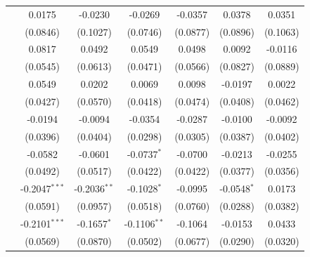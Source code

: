 \begin{tabular}{lcccccc}
   \qquad 2004                    & 0.0175                & -0.0230         & -0.0269               & -0.0357         & 0.0378         & 0.0351\\   
                                    & (0.0846)              & (0.1027)        & (0.0746)              & (0.0877)        & (0.0896)       & (0.1063)\\   
   \qquad 2005                    & 0.0817                & 0.0492          & 0.0549                & 0.0498          & 0.0092         & -0.0116\\   
                                    & (0.0545)              & (0.0613)        & (0.0471)              & (0.0566)        & (0.0827)       & (0.0889)\\   
   \qquad 2006                    & 0.0549                & 0.0202          & 0.0069                & 0.0098          & -0.0197        & 0.0022\\   
                                    & (0.0427)              & (0.0570)        & (0.0418)              & (0.0474)        & (0.0408)       & (0.0462)\\   
   \qquad 2007                    & -0.0194               & -0.0094         & -0.0354               & -0.0287         & -0.0100        & -0.0092\\   
                                    & (0.0396)              & (0.0404)        & (0.0298)              & (0.0305)        & (0.0387)       & (0.0402)\\   
   \qquad 2008                    & -0.0582               & -0.0601         & -0.0737$^{*}$         & -0.0700         & -0.0213        & -0.0255\\   
                                    & (0.0492)              & (0.0517)        & (0.0422)              & (0.0422)        & (0.0377)       & (0.0356)\\   
   \qquad 2010                    & -0.2047$^{***}$       & -0.2036$^{**}$  & -0.1028$^{*}$         & -0.0995         & -0.0548$^{*}$  & 0.0173\\   
                                    & (0.0591)              & (0.0957)        & (0.0518)              & (0.0760)        & (0.0288)       & (0.0382)\\   
   \qquad 2011                    & -0.2101$^{***}$       & -0.1657$^{*}$   & -0.1106$^{**}$        & -0.1064         & -0.0153        & 0.0433\\   
                                    & (0.0569)              & (0.0870)        & (0.0502)              & (0.0677)        & (0.0290)       & (0.0320)\\   

\end{tabular}
